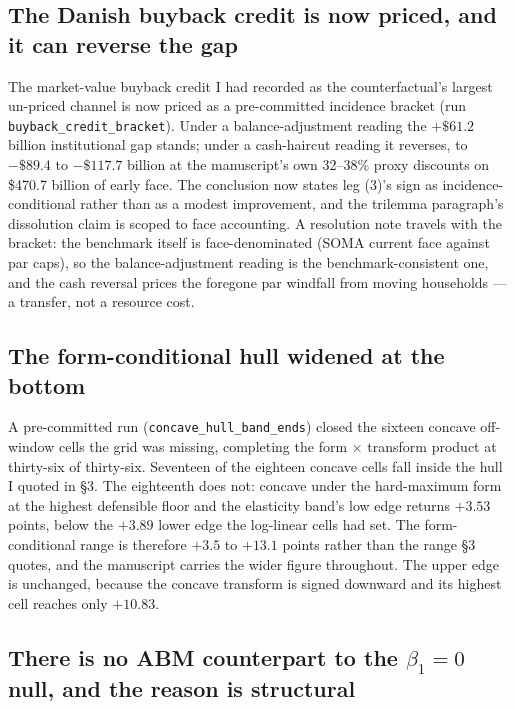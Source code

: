 \documentclass[11pt]{article}
\newcommand{\run}[1]{\texttt{#1}}
\begin{document}
\subsection{The Danish buyback credit is now priced, and it can reverse the gap}

The market-value buyback credit I had recorded as the counterfactual's largest
un-priced channel is now priced as a pre-committed incidence bracket (run
\texttt{buyback\_credit\_bracket}). Under a balance-adjustment reading the
$+\$61.2$ billion institutional gap stands; under a cash-haircut reading it
reverses, to $-\$89.4$ to $-\$117.7$ billion at the manuscript's own 32--38\%
proxy discounts on \$470.7 billion of early face. The conclusion now states
leg (3)'s sign as incidence-conditional rather than as a modest improvement,
and the trilemma paragraph's dissolution claim is scoped to face accounting.
A resolution note travels with the bracket: the benchmark itself is
face-denominated (SOMA current face against par caps), so the
balance-adjustment reading is the benchmark-consistent one, and the cash
reversal prices the foregone par windfall from moving households --- a
transfer, not a resource cost.

\subsection{The form-conditional hull widened at the bottom}

A pre-committed run (\run{concave\_hull\_band\_ends}) closed the sixteen concave
off-window cells the grid was missing, completing the form $\times$ transform product
at thirty-six of thirty-six. Seventeen of the eighteen concave cells fall inside the
hull I quoted in \S3. The eighteenth does not: concave under the hard-maximum form at
the highest defensible floor and the elasticity band's low edge returns $+3.53$
points, below the $+3.89$ lower edge the log-linear cells had set. The
form-conditional range is therefore $+3.5$ to $+13.1$ points rather than the range
\S3 quotes, and the manuscript carries the wider figure throughout. The upper edge is unchanged,
because the concave transform is signed downward and its highest cell reaches only
$+10.83$.

\subsection{There is no ABM counterpart to the $\beta_1 = 0$ null, and the reason is
structural}
\end{document}
